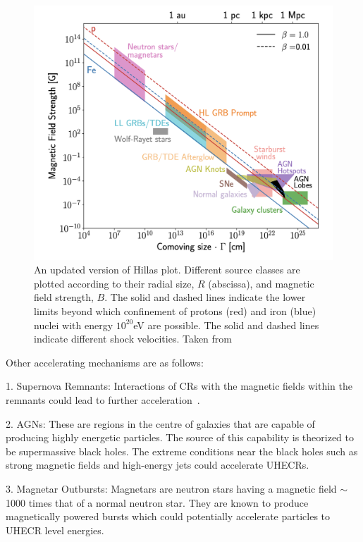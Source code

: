 \begin{figure}[t!]
  \centering
  \includegraphics[width=14.5cm]{thesis_figures/CRnNu/Hillas_modified.png}
  \caption{An updated version of Hillas plot. Different source classes are plotted according to their radial size, $R$ (abscissa), and magnetic field strength, $B$. The solid and dashed lines indicate the lower limits beyond which confinement of protons (red) and iron (blue) nuclei with energy $10^{20}$eV are possible. The solid and dashed lines indicate different shock velocities. Taken from~\cite{AlvesBatista:2019tlv}}
  \label{fig:Hillas_modified}
\end{figure}


Other accelerating mechanisms are as follows:

1. Supernova Remnants:  Interactions of \glspl{CR} with the magnetic fields within the remnants could lead to further acceleration~\cite{BLASI_2011}.

2. \glspl{AGN}: These are regions in the centre of galaxies that are capable of producing highly energetic particles. The source of this capability is theorized to be supermassive black holes. The extreme conditions near the black holes such as strong magnetic fields and high-energy jets could accelerate \glspl{UHECR}.~\cite{Rieger_2022}

3. Magnetar Outbursts: Magnetars are neutron stars having a magnetic field $\sim$1000 times that of a normal neutron star. They are known to produce magnetically powered bursts which could potentially accelerate particles to \gls{UHECR} level energies.~\cite{PhysRevD.84.023002}

